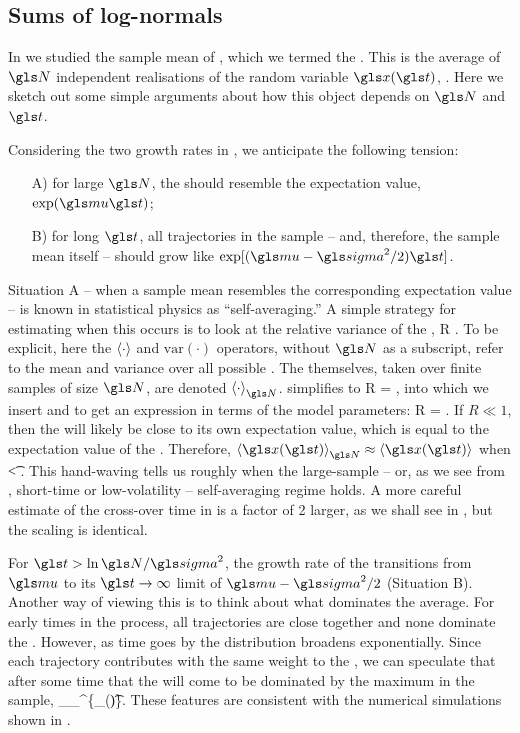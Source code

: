 \subsection{Sums of log-normals}
In \cite{PetersKlein2013} we studied the sample mean of \GBM, which we termed the \PEA. This is the average of $\N$ independent realisations of the random variable $\x(\t)$, . Here we sketch out some simple arguments about how this object depends on $\N$ and $\t$.

Considering the two growth rates in , we anticipate the following tension:
\begin{enumerate}
\item[A)] for large $\N$, the \PEA should resemble the expectation value, $\exp(\gmu \t)$;
\item[B)] for long $\t$, all trajectories in the sample -- and, therefore, the sample mean itself -- should grow like $\exp[(\gmu-\gsigma^2/2)\t]$.
\end{enumerate}
Situation A -- when a sample mean resembles the corresponding expectation value -- is known in statistical physics as ``self-averaging.'' A simple strategy for estimating when this occurs is to look at the relative variance of the \PEA,
\be
R \equiv {}.
\ee
To be explicit, here the $\left\langle\cdot\right\rangle$ and $\text{var}(\cdot)$ operators, 
without $\N$ as a subscript, 
refer to the mean and variance over all possible \PEAs. The \PEAs themselves, taken over finite samples of size $\N$, are denoted $\ave{\cdot}_\N$.  simplifies to
\be
R = ,
\ee
into which we insert  and  to get an expression in terms of the \GBM model parameters:
\be
R = .
\ee
If $R \ll 1$, then the \PEA will likely be close to its own expectation value, which is equal to the expectation value of the \GBM. Therefore, $\ave{\x(\t)}_\N\approx\ave{\x(\t)}$ when
\be
\t < .
\ee
This hand-waving tells us roughly when the large-sample -- or, as we see from , short-time or low-volatility -- self-averaging regime holds. A more careful estimate of the cross-over time in  is a factor of 2 larger, as we shall see in , but the scaling is identical.

For $\t>\ln \N/\gsigma^2$, the growth rate of the \PEA transitions from $\gmu$ to its $\t\to\infty$ limit of $\gmu-\gsigma^2/2$ (Situation B). 
Another way of viewing this is to think about what dominates the average. For early times in the process, all trajectories are close together and none dominate the \PEA. However, as time goes by the distribution broadens exponentially. Since each trajectory contributes with the same weight to the \PEA, we can speculate that after some time that the \PEA will come to be dominated by the maximum in the sample,
\be
\ave{\x(\t)}_\N \approx {}\max_{}^\N \{\x_\gi(\t)\}.
\ee
These features are consistent with the numerical simulations shown in .


